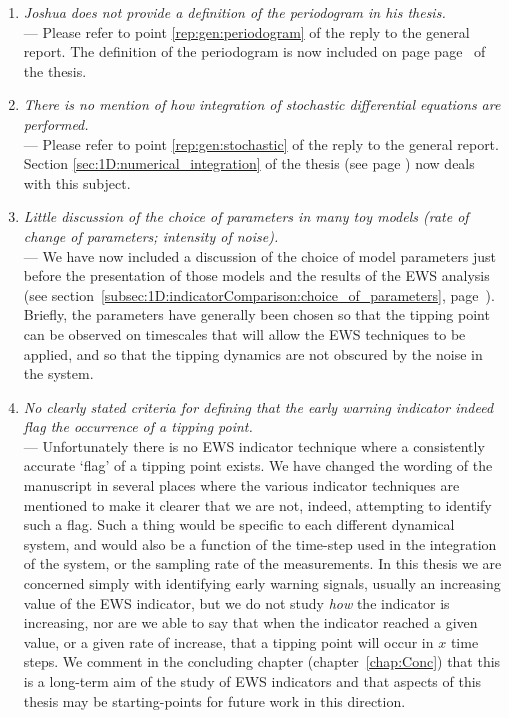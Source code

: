 \begin{enumerate}
\item \emph{Joshua does not provide a definition of the periodogram in his thesis.} \\
— Please refer to point \ref{rep:gen:periodogram} of the reply to the general report. The definition of the periodogram is now included on page page~\pageref{def:1D:periodogram} of the thesis.
\item \emph{There is no mention of how integration of stochastic differential equations are performed.}\\
— Please refer to point \ref{rep:gen:stochastic} of the reply to the general report. Section \ref{sec:1D:numerical_integration} of the thesis (see page \pageref{sec:1D:numerical_integration}) now deals with this subject.
\item \label{rep:2:toymodels} \emph{Little discussion of the choice of parameters in many toy models (rate of change of parameters; intensity of noise).}\\
— We have now included a discussion of the choice of model parameters just before the presentation of those models and the results of the EWS analysis (see section~\ref{subsec:1D:indicatorComparison:choice_of_parameters}, page~\pageref{subsec:1D:indicatorComparison:choice_of_parameters}). Briefly, the parameters have generally been chosen so that the tipping point can be observed on timescales that will allow the EWS techniques to be applied, and so that the tipping dynamics are not obscured by the noise in the system.
\item \label{rep:2:flag} \emph{No clearly stated criteria for defining that the early warning indicator indeed flag the occurrence of a tipping point.} \\
— Unfortunately there is no EWS indicator technique where a consistently accurate `flag' of a tipping point exists. We have changed the wording of the manuscript in several places where the various indicator techniques are mentioned to make it clearer that we are not, indeed, attempting to identify such a flag. Such a thing would be specific to each different dynamical system, and would also be a function of the time-step used in the integration of the system, or the sampling rate of the measurements. In this thesis we are concerned simply with identifying early warning signals, usually an increasing value of the EWS indicator, but we do not study \emph{how} the indicator is increasing, nor are we able to say that when the indicator reached a given value, or a given rate of increase, that a tipping point will occur in $x$ time steps. We comment in the concluding chapter (chapter~\ref{chap:Conc}) that this is a long-term aim of the study of EWS indicators and that aspects of this thesis may be starting-points for future work in this direction.

\end{enumerate}
